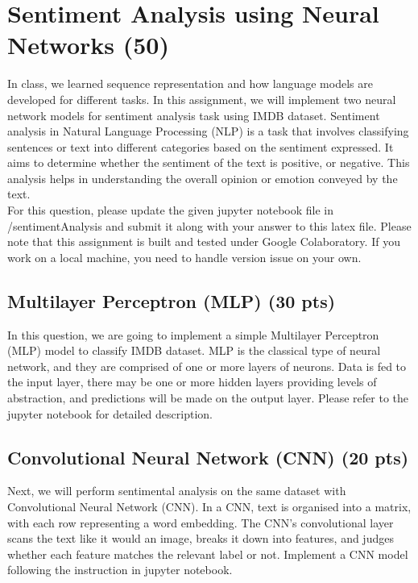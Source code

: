 \documentclass{assignment format}
\begin{document}
\section{Sentiment Analysis using Neural Networks (50)}

In class, we learned sequence representation and how language models are developed for different tasks. In this assignment, we will implement two neural network models for sentiment analysis task using IMDB dataset. Sentiment analysis in Natural Language Processing (NLP) is a task that involves classifying sentences or text into different categories based on the sentiment expressed. It aims to determine whether the sentiment of the text is positive, or negative. This analysis helps in understanding the overall opinion or emotion conveyed by the text.\\
For this question, please update the given jupyter notebook file in /sentimentAnalysis and submit it along with your answer to this latex file. Please note that this assignment is built and tested under Google Colaboratory. If you work on a local machine, you need to handle version issue on your own. 
\subsection{Multilayer Perceptron (MLP) (30 pts)}
In this question, we are going to implement a simple Multilayer Perceptron (MLP) model to classify IMDB dataset. MLP is the classical type of neural network, and they are comprised of one or more layers of neurons. Data is fed to the input layer, there may be one or more hidden layers providing levels of abstraction, and predictions will be made on the output layer. Please refer to the jupyter notebook for detailed description.
\subsection{Convolutional Neural Network (CNN) (20 pts)}
Next, we will perform sentimental analysis on the same dataset with Convolutional Neural Network (CNN). In a CNN, text is organised into a matrix, with each row representing a word embedding. The CNN’s convolutional layer scans the text like it would an image, breaks it down into features, and judges whether each feature matches the relevant label or not. Implement a CNN model following the instruction in jupyter notebook.
\end{document}
